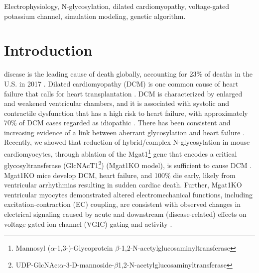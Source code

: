 \documentclass[journal]{IEEEtran}
\begin{document}
\begin{IEEEkeywords}
Electrophysiology, N-glycosylation, dilated cardiomyopathy, voltage-gated potassium channel, simulation modeling, genetic algorithm. 
\end{IEEEkeywords}

%
\IEEEpeerreviewmaketitle

\section{Introduction}
 disease is the leading cause of death globally, accounting for 23\% of deaths in the U.S. in 2017 \cite{cdc2019deaths}. Dilated cardiomyopathy (DCM) is one common cause of heart failure that calls for heart transplantation \cite{weintraub2017dilated}. DCM is characterized by enlarged and weakened ventricular chambers, and it is associated with systolic and contractile dysfunction that has a high risk to heart failure, with approximately 70\% of DCM cases regarded as idiopathic \cite{weintraub2017dilated, lakdawala2013dilated, hershberger2011update}. There has been consistent and increasing evidence of a link between aberrant glycosylation and heart failure \cite{gehrmann2003cardiomyopathy, footitt2009cardiomyopathy, marques2017cardiac}. Recently, we showed that reduction of hybrid/complex N-glycosylation in mouse cardiomyocytes, through ablation of the Mgat1\footnote{Mannosyl ($\alpha$-1,3-)-Glycoprotein $\beta$-1,2-N-acetylglucosaminyltransferase} gene that encodes a critical glycosyltransferase (GlcNAcT1\footnote{UDP-GlcNAc:$\alpha$-3-D-mannoside-$\beta$1,2-N-acetylglucosaminyltransferase}) (Mgat1KO model), is sufficient to cause DCM \cite{ednie2019reduced, ednie2019reduced2}. Mgat1KO mice develop DCM, heart failure, and 100\% die early, likely from ventricular arrhythmias resulting in sudden cardiac death. Further, Mgat1KO ventricular myocytes demonstrated altered electromechanical functions, including excitation-contraction (EC) coupling, are consistent with observed changes in electrical signaling caused by acute and downstream (disease-related) effects on voltage-gated ion channel (VGIC) gating and activity \cite{ednie2019reduced}. 
\end{document}

